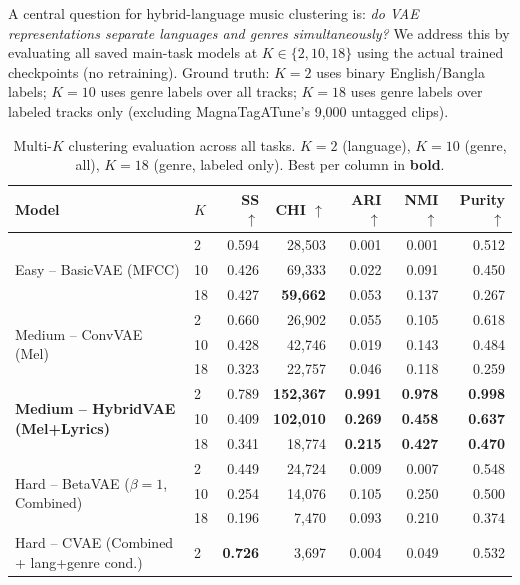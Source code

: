 \documentclass{article}
\begin{document}
A central question for hybrid-language music clustering is: \emph{do VAE representations separate languages and genres simultaneously?} We address this by evaluating all saved main-task models at $K\!\in\!\{2, 10, 18\}$ using the actual trained checkpoints (no retraining). Ground truth: $K\!=\!2$ uses binary English/Bangla labels; $K\!=\!10$ uses genre labels over all tracks; $K\!=\!18$ uses genre labels over labeled tracks only (excluding MagnaTagATune's 9,000 untagged clips).

\begin{table}[H]
\centering
\caption{Multi-$K$ clustering evaluation across all tasks. $K\!=\!2$ (language), $K\!=\!10$ (genre, all), $K\!=\!18$ (genre, labeled only). Best per column in \textbf{bold}.}
\label{tab:multi_k}
\small
\begin{tabular}{llrrrrr}
\toprule
\textbf{Model} & \textbf{$K$} & \textbf{SS $\uparrow$} & \textbf{CHI $\uparrow$} & \textbf{ARI $\uparrow$} & \textbf{NMI $\uparrow$} & \textbf{Purity $\uparrow$} \\
\midrule
\multirow{3}{*}{Easy -- BasicVAE (MFCC)}
 & 2  & 0.594 & 28,503 & 0.001 & 0.001 & 0.512 \\
 & 10 & 0.426 & 69,333 & 0.022 & 0.091 & 0.450 \\
 & 18 & 0.427 & \textbf{59,662} & 0.053 & 0.137 & 0.267 \\
\midrule
\multirow{3}{*}{Medium -- ConvVAE (Mel)}
 & 2  & 0.660 & 26,902 & 0.055 & 0.105 & 0.618 \\
 & 10 & 0.428 & 42,746 & 0.019 & 0.143 & 0.484 \\
 & 18 & 0.323 & 22,757 & 0.046 & 0.118 & 0.259 \\
\midrule
\multirow{3}{*}{\textbf{Medium -- HybridVAE (Mel+Lyrics)}}
 & 2  & 0.789 & \textbf{152,367} & \textbf{0.991} & \textbf{0.978} & \textbf{0.998} \\
 & 10 & 0.409 & \textbf{102,010} & \textbf{0.269} & \textbf{0.458} & \textbf{0.637} \\
 & 18 & 0.341 & 18,774 & \textbf{0.215} & \textbf{0.427} & \textbf{0.470} \\
\midrule
\multirow{3}{*}{Hard -- BetaVAE ($\beta\!=\!1$, Combined)}
 & 2  & 0.449 & 24,724 & 0.009 & 0.007 & 0.548 \\
 & 10 & 0.254 & 14,076 & 0.105 & 0.250 & 0.500 \\
 & 18 & 0.196 & 7,470  & 0.093 & 0.210 & 0.374 \\
\midrule
\multirow{3}{*}{Hard -- CVAE (Combined + lang+genre cond.)}
 & 2  & \textbf{0.726} & 3,697  & 0.004 & 0.049 & 0.532 \\

\end{tabular}
\end{table}
\end{document}
